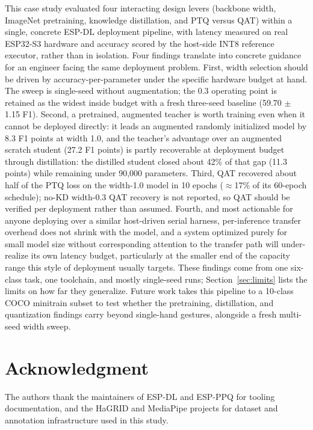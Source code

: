 \documentclass[conference]{IEEEtran}
\begin{document}
	This case study evaluated four interacting design levers (backbone width, ImageNet
	pretraining, knowledge distillation, and PTQ versus QAT) within a single, concrete ESP-DL
	deployment pipeline, with latency measured on real ESP32-S3 hardware and accuracy scored by the host-side INT8 reference executor, rather than in isolation. Four
	findings translate into concrete guidance for an engineer facing the same deployment problem.
	First, width selection should be driven by accuracy-per-parameter under the specific hardware
	budget at hand. The sweep is single-seed without augmentation; the 0.3 operating point is retained as the widest inside budget with a fresh three-seed baseline (59.70 $\pm$ 1.15 F1). Second, a pretrained, augmented teacher is worth training even when it cannot be deployed directly: it leads an augmented randomly initialized model by 8.3 F1 points at width 1.0, and the teacher's advantage over an augmented scratch student (27.2 F1 points) is partly recoverable at deployment budget through distillation: the distilled student closed about 42\% of that gap (11.3 points) while remaining under 90{,}000 parameters. Third, QAT recovered about half of the PTQ loss on the width-1.0 model in 10 epochs ($\approx$17\% of its 60-epoch schedule); no-KD width-0.3 QAT recovery is not reported, so QAT should be verified per deployment rather than assumed. Fourth, and most actionable for anyone deploying
	over a similar host-driven serial harness, per-inference transfer overhead does not shrink with the
	model, and a system optimized purely for small model size without corresponding attention to
	the transfer path will under-realize its own latency budget, particularly at the smaller end
	of the capacity range this style of deployment usually targets. These findings come from one six-class task, one toolchain, and mostly single-seed runs; Section~\ref{sec:limits} lists the limits on how far they generalize. Future work takes this pipeline to a 10-class COCO minitrain subset to test whether the pretraining, distillation, and quantization findings carry beyond single-hand gestures, alongside a fresh multi-seed width sweep.
	
	\section*{Acknowledgment}
	
	The authors thank the maintainers of ESP-DL and ESP-PPQ for tooling documentation, and the
	HaGRID and MediaPipe projects for dataset and annotation infrastructure used in this study.
	
\end{document}
